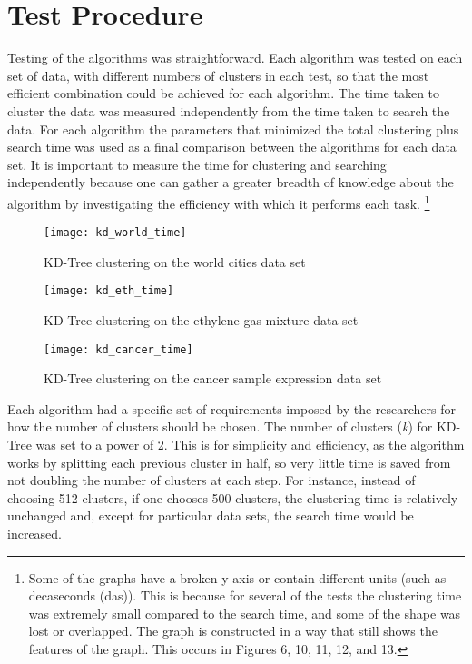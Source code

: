 \documentclass[journal]{IEEEtran}
\begin{document}
\section{Test Procedure}
Testing of the algorithms was straightforward. Each algorithm was tested on each set of data, with different numbers of clusters in each test, so that the most efficient combination could be achieved for each algorithm. The time taken to cluster the data was measured independently from the time taken to search the data. For each algorithm the parameters that minimized the total clustering plus search time was used as a final comparison between the algorithms for each data set. It is important to measure the time for clustering and searching independently because one can gather a greater breadth of knowledge about the algorithm by investigating the efficiency with which it performs each task. \footnote{Some of the graphs have a broken y-axis or contain different units (such as decaseconds (das)). This is because for several of the tests the clustering time was extremely small compared to the search time, and some of the shape was lost or overlapped. The graph is constructed in a way that still shows the features of the graph. This occurs in Figures 6, 10, 11, 12, and 13.}

\begin{figure}[h]
	\texttt{[image: kd\_world\_time]}
	\caption{KD-Tree clustering on the world cities data set}
\end{figure}
\begin{figure}[h]
	\texttt{[image: kd\_eth\_time]}
	\caption{KD-Tree clustering on the ethylene gas mixture data set}
\end{figure}
\begin{figure}[h!]
	\texttt{[image: kd\_cancer\_time]}
	\caption{KD-Tree clustering on the cancer sample expression data set}
\end{figure}

Each algorithm had a specific set of requirements imposed by the researchers for how the number of clusters should be chosen. The number of clusters (\textit{k}) for KD-Tree was set to a power of 2. This is for simplicity and efficiency, as the algorithm works by splitting each previous cluster in half, so very little time is saved from not doubling the number of clusters at each step. For instance, instead of choosing 512 clusters, if one chooses 500 clusters, the clustering time is relatively unchanged and, except for particular data sets, the search time would be increased. 
\end{document}

